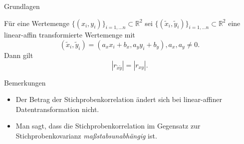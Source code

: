 \documentclass[
  8pt,
  ignorenonframetext,
]{beamer}
\providecommand{\tightlist}{%
  \setlength{\itemsep}{0pt}\setlength{\parskip}{0pt}}
\begin{document}
\begin{frame}{Grundlagen}
\protect\hypertarget{grundlagen-8}{}
\footnotesize
\begin{theorem}
\justifying
\normalfont
Für eine Wertemenge $\{(x_i,y_i)\}_{i = 1,...n} \subset \mathbb{R}^2$ sei
$\{(\tilde{x}_i,\tilde{y}_i)\}_{i = 1,...n} \subset \mathbb{R}^2$ eine linear-affin
transformierte Wertemenge mit
\begin{equation}
(\tilde{x}_i, \tilde{y}_i) = (a_x x_i + b_x, a_y y_i + b_y), a_x,a_y \neq 0.
\end{equation}
Dann gilt
\begin{equation}
|r_{\tilde{x}\tilde{y}}| = |r_{xy}|.
\end{equation}
\end{theorem}

Bemerkungen

\begin{itemize}
\tightlist
\item
  Der Betrag der Stichprobenkorrelation ändert sich bei linear-affiner
  Datentransformation nicht.
\item
  Man sagt, dass die Stichprobenkorrelation im Gegensatz zur
  Stichprobenkovarianz \textit{maßstabsunabhängig} ist.
\end{itemize}
\end{frame}
\end{document}
